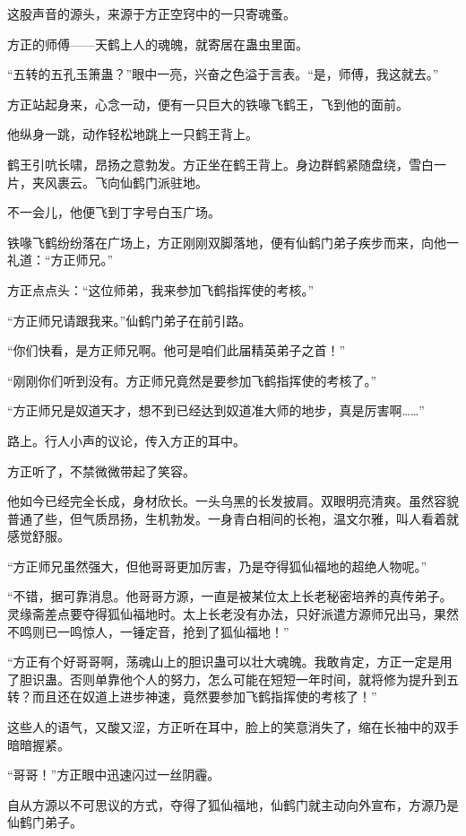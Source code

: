 \begin{this_body}
这股声音的源头，来源于方正空窍中的一只寄魂蚤。

方正的师傅——天鹤上人的魂魄，就寄居在蛊虫里面。

“五转的五孔玉箫蛊？”眼中一亮，兴奋之色溢于言表。“是，师傅，我这就去。”

方正站起身来，心念一动，便有一只巨大的铁喙飞鹤王，飞到他的面前。

他纵身一跳，动作轻松地跳上一只鹤王背上。

鹤王引吭长啸，昂扬之意勃发。方正坐在鹤王背上。身边群鹤紧随盘绕，雪白一片，夹风裹云。飞向仙鹤门派驻地。

不一会儿，他便飞到丁字号白玉广场。

铁喙飞鹤纷纷落在广场上，方正刚刚双脚落地，便有仙鹤门弟子疾步而来，向他一礼道：“方正师兄。”

方正点点头：“这位师弟，我来参加飞鹤指挥使的考核。”

“方正师兄请跟我来。”仙鹤门弟子在前引路。

“你们快看，是方正师兄啊。他可是咱们此届精英弟子之首！”

“刚刚你们听到没有。方正师兄竟然是要参加飞鹤指挥使的考核了。”

“方正师兄是奴道天才，想不到已经达到奴道准大师的地步，真是厉害啊……”

路上。行人小声的议论，传入方正的耳中。

方正听了，不禁微微带起了笑容。

他如今已经完全长成，身材欣长。一头乌黑的长发披肩。双眼明亮清爽。虽然容貌普通了些，但气质昂扬，生机勃发。一身青白相间的长袍，温文尔雅，叫人看着就感觉舒服。

“方正师兄虽然强大，但他哥哥更加厉害，乃是夺得狐仙福地的超绝人物呢。”

“不错，据可靠消息。他哥哥方源，一直是被某位太上长老秘密培养的真传弟子。灵缘斋差点要夺得狐仙福地时。太上长老没有办法，只好派遣方源师兄出马，果然不鸣则已一鸣惊人，一锤定音，抢到了狐仙福地！”

“方正有个好哥哥啊，荡魂山上的胆识蛊可以壮大魂魄。我敢肯定，方正一定是用了胆识蛊。否则单靠他个人的努力，怎么可能在短短一年时间，就将修为提升到五转？而且还在奴道上进步神速，竟然要参加飞鹤指挥使的考核了！”

这些人的语气，又酸又涩，方正听在耳中，脸上的笑意消失了，缩在长袖中的双手暗暗握紧。

“哥哥！”方正眼中迅速闪过一丝阴霾。

自从方源以不可思议的方式，夺得了狐仙福地，仙鹤门就主动向外宣布，方源乃是仙鹤门弟子。


\end{this_body}
